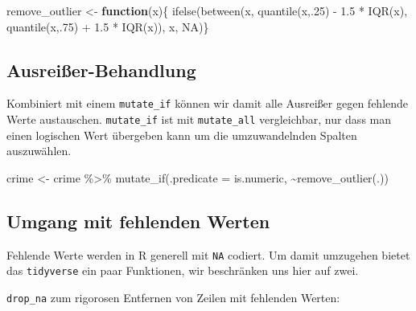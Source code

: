 \documentclass[
]{book}
\newenvironment{Shaded}{\begin{snugshade}}{\end{snugshade}}
\newcommand{\AttributeTok}[1]{\textcolor[rgb]{0.77,0.63,0.00}{#1}}
\newcommand{\ConstantTok}[1]{\textcolor[rgb]{0.00,0.00,0.00}{#1}}
\newcommand{\ControlFlowTok}[1]{\textcolor[rgb]{0.13,0.29,0.53}{\textbf{#1}}}
\newcommand{\DecValTok}[1]{\textcolor[rgb]{0.00,0.00,0.81}{#1}}
\newcommand{\FloatTok}[1]{\textcolor[rgb]{0.00,0.00,0.81}{#1}}
\newcommand{\FunctionTok}[1]{\textcolor[rgb]{0.00,0.00,0.00}{#1}}
\newcommand{\NormalTok}[1]{#1}
\newcommand{\OtherTok}[1]{\textcolor[rgb]{0.56,0.35,0.01}{#1}}
\newcommand{\SpecialCharTok}[1]{\textcolor[rgb]{0.00,0.00,0.00}{#1}}
\begin{document}
\begin{Shaded}
\begin{Highlighting}[]
\NormalTok{remove\_outlier }\OtherTok{\textless{}{-}} \ControlFlowTok{function}\NormalTok{(x)\{}
  \FunctionTok{ifelse}\NormalTok{(}\FunctionTok{between}\NormalTok{(x,}
                 \FunctionTok{quantile}\NormalTok{(x,.}\DecValTok{25}\NormalTok{) }\SpecialCharTok{{-}} \FloatTok{1.5} \SpecialCharTok{*} \FunctionTok{IQR}\NormalTok{(x),}
                 \FunctionTok{quantile}\NormalTok{(x,.}\DecValTok{75}\NormalTok{) }\SpecialCharTok{+} \FloatTok{1.5} \SpecialCharTok{*} \FunctionTok{IQR}\NormalTok{(x)),}
\NormalTok{          x,}
          \ConstantTok{NA}\NormalTok{)\}}
\end{Highlighting}
\end{Shaded}

\hypertarget{ausreiuxdfer-behandlung-1}{%
\subsection{Ausreißer-Behandlung}\label{ausreiuxdfer-behandlung-1}}

Kombiniert mit einem \texttt{mutate\_if} können wir damit alle Ausreißer gegen fehlende Werte austauschen. \texttt{mutate\_if} ist mit \texttt{mutate\_all} vergleichbar, nur dass man einen logischen Wert übergeben kann um die umzuwandelnden Spalten auszuwählen.

\begin{Shaded}
\begin{Highlighting}[]
\NormalTok{crime }\OtherTok{\textless{}{-}}\NormalTok{ crime }\SpecialCharTok{\%\textgreater{}\%} 
  \FunctionTok{mutate\_if}\NormalTok{(}\AttributeTok{.predicate =}\NormalTok{ is.numeric,}
            \SpecialCharTok{\textasciitilde{}}\FunctionTok{remove\_outlier}\NormalTok{(.))}
\end{Highlighting}
\end{Shaded}

\hypertarget{umgang-mit-fehlenden-werten}{%
\subsection{Umgang mit fehlenden Werten}\label{umgang-mit-fehlenden-werten}}

Fehlende Werte werden in R generell mit \texttt{NA} codiert. Um damit umzugehen bietet das \texttt{tidyverse} ein paar Funktionen, wir beschränken uns hier auf zwei.

\texttt{drop\_na} zum rigorosen Entfernen von Zeilen mit fehlenden Werten:
\end{document}
